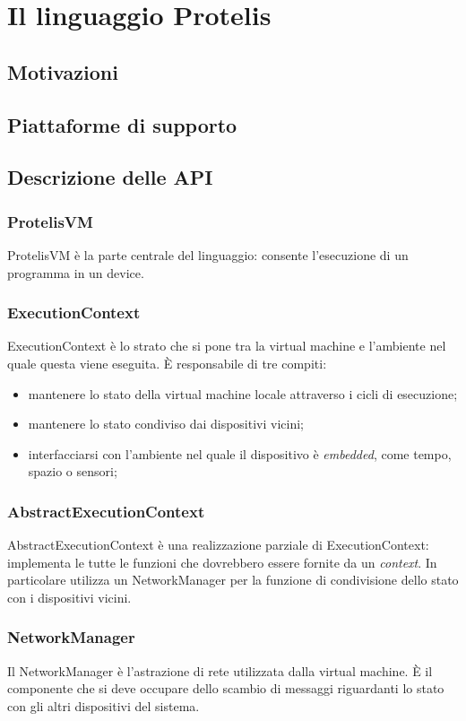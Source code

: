 \section{Il linguaggio Protelis}
\subsection{Motivazioni}

\subsection{Piattaforme di supporto}

\subsection{Descrizione delle API}

\subsubsection{ProtelisVM}

ProtelisVM è la parte centrale del linguaggio: consente l'esecuzione di un programma in un device.

\subsubsection{ExecutionContext}

ExecutionContext è lo strato che si pone tra la virtual machine e l'ambiente nel quale questa viene eseguita. È responsabile di tre compiti:

\begin{itemize}
    \item{mantenere lo stato della virtual machine locale attraverso i cicli di esecuzione;}

    \item{mantenere lo stato condiviso dai dispositivi vicini;}

    \item{interfacciarsi con l'ambiente nel quale il dispositivo è \textit{embedded}, come tempo, spazio o sensori;}
\end{itemize}

\subsubsection{AbstractExecutionContext}

AbstractExecutionContext è una realizzazione parziale di ExecutionContext: implementa le tutte le funzioni che dovrebbero essere fornite da un \textit{context}. In particolare utilizza un NetworkManager per la funzione di condivisione dello stato con i dispositivi vicini.

\subsubsection{NetworkManager}

Il NetworkManager è l'astrazione di rete utilizzata dalla virtual machine. È il componente che si deve occupare dello scambio di messaggi riguardanti lo stato con gli altri dispositivi del sistema.